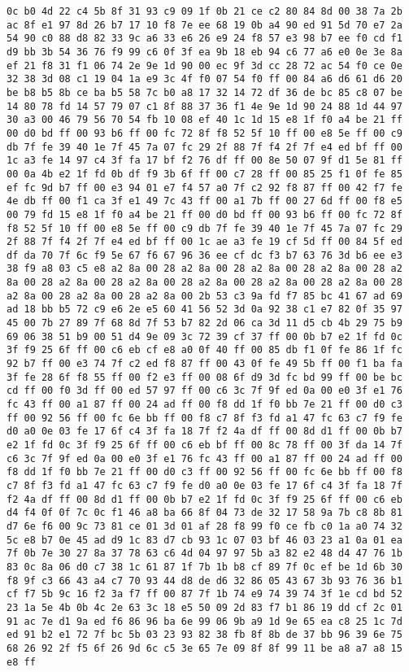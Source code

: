 \documentclass{article}
\begin{document}
\begin{verbatim}
0c b0 4d 22 c4 5b 8f 31 93 c9 09 1f 0b 21 ce c2 80 84 8d 00 38 7a 2b ac 8f e1 97 8d 26 b7 17 10 f8 7e ee 68 19 0b a4 90 ed 91 5d 70 e7 2a 54 90 c0 88 d8 82 33 9c a6 33 e6 26 e9 24 f8 57 e3 98 b7 ee f0 cd f1 d9 bb 3b 54 36 76 f9 99 c6 0f 3f ea 9b 18 eb 94 c6 77 a6 e0 0e 3e 8a ef 21 f8 31 f1 06 74 2e 9e 1d 90 00 ec 9f 3d cc 28 72 ac 54 f0 ce 0e 32 38 3d 08 c1 19 04 1a e9 3c 4f f0 07 54 f0 ff 00 84 a6 d6 61 d6 20 be b8 b5 8b ce ba b5 58 7c b0 a8 17 32 14 72 df 36 de bc 85 c8 07 be 14 80 78 fd 14 57 79 07 c1 8f 88 37 36 f1 4e 9e 1d 90 24 88 1d 44 97 30 a3 00 46 79 56 70 54 fb 10 08 ef 40 1c 1d 15 e8 1f f0 a4 be 21 ff 00 d0 bd ff 00 93 b6 ff 00 fc 72 8f f8 52 5f 10 ff 00 e8 5e ff 00 c9 db 7f fe 39 40 1e 7f 45 7a 07 fc 29 2f 88 7f f4 2f 7f e4 ed bf ff 00 1c a3 fe 14 97 c4 3f fa 17 bf f2 76 df ff 00 8e 50 07 9f d1 5e 81 ff 00 0a 4b e2 1f fd 0b df f9 3b 6f ff 00 c7 28 ff 00 85 25 f1 0f fe 85 ef fc 9d b7 ff 00 e3 94 01 e7 f4 57 a0 7f c2 92 f8 87 ff 00 42 f7 fe 4e db ff 00 f1 ca 3f e1 49 7c 43 ff 00 a1 7b ff 00 27 6d ff 00 f8 e5 00 79 fd 15 e8 1f f0 a4 be 21 ff 00 d0 bd ff 00 93 b6 ff 00 fc 72 8f f8 52 5f 10 ff 00 e8 5e ff 00 c9 db 7f fe 39 40 1e 7f 45 7a 07 fc 29 2f 88 7f f4 2f 7f e4 ed bf ff 00 1c ae a3 fe 19 cf 5d ff 00 84 5f ed df da 70 7f 6c f9 5e 67 f6 67 96 36 ee cf dc f3 b7 63 76 3d b6 ee e3 38 f9 a8 03 c5 e8 a2 8a 00 28 a2 8a 00 28 a2 8a 00 28 a2 8a 00 28 a2 8a 00 28 a2 8a 00 28 a2 8a 00 28 a2 8a 00 28 a2 8a 00 28 a2 8a 00 28 a2 8a 00 28 a2 8a 00 28 a2 8a 00 2b 53 c3 9a fd f7 85 bc 41 67 ad 69 ad 18 bb b5 72 c9 e6 2e e5 60 41 56 52 3d 0a 92 38 c1 e7 82 0f 35 97 45 00 7b 27 89 7f 68 8d 7f 53 b7 82 2d 06 ca 3d 11 d5 cb 4b 29 75 b9 69 06 38 51 b9 00 51 d4 9e 09 3c 72 39 cf 37 ff 00 0b b7 e2 1f fd 0c 3f f9 25 6f ff 00 c6 eb cf e8 a0 0f 40 ff 00 85 db f1 0f fe 86 1f fc 92 b7 ff 00 e3 74 7f c2 ed f8 87 ff 00 43 0f fe 49 5b ff 00 f1 ba fa 3f fe 28 6f f8 55 ff 00 f2 e3 ff 00 08 6f d9 3d fc bd 99 ff 00 be bc cd ff 00 f0 3d ff 00 ed 57 97 ff 00 c6 3c 7f 9f ed 0a 00 e0 3f e1 76 fc 43 ff 00 a1 87 ff 00 24 ad ff 00 f8 dd 1f f0 bb 7e 21 ff 00 d0 c3 ff 00 92 56 ff 00 fc 6e bb ff 00 f8 c7 8f f3 fd a1 47 fc 63 c7 f9 fe d0 a0 0e 03 fe 17 6f c4 3f fa 18 7f f2 4a df ff 00 8d d1 ff 00 0b b7 e2 1f fd 0c 3f f9 25 6f ff 00 c6 eb bf ff 00 8c 78 ff 00 3f da 14 7f c6 3c 7f 9f ed 0a 00 e0 3f e1 76 fc 43 ff 00 a1 87 ff 00 24 ad ff 00 f8 dd 1f f0 bb 7e 21 ff 00 d0 c3 ff 00 92 56 ff 00 fc 6e bb ff 00 f8 c7 8f f3 fd a1 47 fc 63 c7 f9 fe d0 a0 0e 03 fe 17 6f c4 3f fa 18 7f f2 4a df ff 00 8d d1 ff 00 0b b7 e2 1f fd 0c 3f f9 25 6f ff 00 c6 eb d4 f4 0f 0f 7c 0c f1 46 a8 ba 66 8f 04 73 de 32 17 58 9a 7b c8 8b 81 d7 6e f6 00 9c 73 81 ce 01 3d 01 af 28 f8 99 f0 ce fb c0 1a a0 74 32 5c e8 b7 0e 45 ad d9 1c 83 d7 cb 93 1c 07 03 bf 46 03 23 a1 0a 01 ea 7f 0b 7e 30 27 8a 37 78 63 c6 4d 04 97 97 5b a3 82 e2 48 d4 47 76 1b 83 0c 8a 06 d0 c7 38 1c 61 87 1f 7b 1b b8 cf 89 7f 0c ef be 1d 6b 30 f8 9f c3 66 43 a4 c7 70 93 44 d8 de d6 32 86 05 43 67 3b 93 76 36 b1 cf f7 5b 9c 16 f2 3a f7 ff 00 87 7f 1b 74 e9 74 39 74 3f 1e cd bd 52 23 1a 5e 4b 0b 4c 2e 63 3c 18 e5 50 09 2d 83 f7 b1 86 19 dd cf 2c 01 91 ac 7e d1 9a ed f6 86 96 ba 6e 99 06 9b a9 1d 9e 65 ea c8 25 1c 7d ed 91 b2 e1 72 7f bc 5b 03 23 93 82 38 fb 8f 8b de 37 bb 96 39 6e 75 68 26 92 2f f5 6f 26 9d 6c c5 3e 65 7e 09 8f 8f 99 11 be a8 a7 a8 15 e8 ff 
\end{verbatim}
\end{document}
